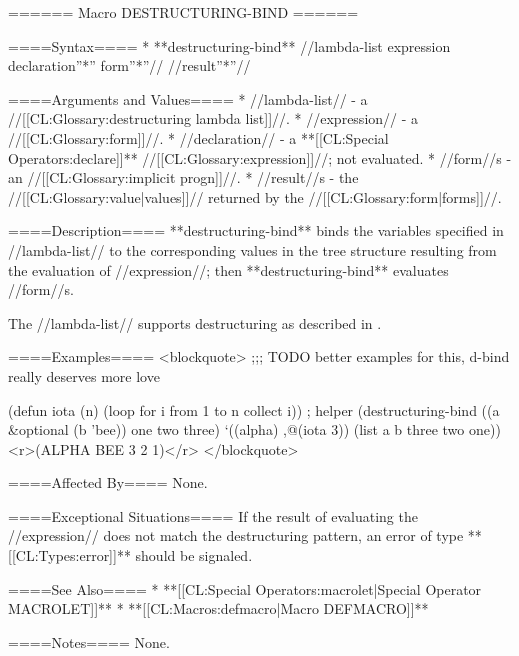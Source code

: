 ====== Macro DESTRUCTURING-BIND ======

====Syntax====
  *  **destructuring-bind** //lambda-list expression declaration''*'' form''*''// //result''*''//

====Arguments and Values====
  * //lambda-list// - a //[[CL:Glossary:destructuring lambda list]]//.
  * //expression// - a //[[CL:Glossary:form]]//.
  * //declaration// - a **[[CL:Special Operators:declare]]** //[[CL:Glossary:expression]]//; not evaluated.
  * //form//s - an //[[CL:Glossary:implicit progn]]//.
  * //result//s - the //[[CL:Glossary:value|values]]// returned by the //[[CL:Glossary:form|forms]]//.

====Description====
**destructuring-bind** binds the variables specified in //lambda-list// to the corresponding values in the tree structure resulting from the evaluation of //expression//; then **destructuring-bind** evaluates //form//s.

The //lambda-list// supports destructuring as described in \secref\DestructuringLambdaLists.

====Examples====
<blockquote>
;;; TODO better examples for this, d-bind really deserves more love

(defun iota (n) (loop for i from 1 to n collect i)) ; helper
(destructuring-bind ((a &optional (b 'bee)) one two three) 
    `((alpha) ,@(iota 3))
  (list a b three two one)) <r>(ALPHA BEE 3 2 1)</r>
</blockquote>

====Affected By====
None.

====Exceptional Situations====
If the result of evaluating the //expression// does not match the destructuring pattern, an error of type **[[CL:Types:error]]** should be signaled.

====See Also====
  * **[[CL:Special Operators:macrolet|Special Operator MACROLET]]**
  * **[[CL:Macros:defmacro|Macro DEFMACRO]]**

====Notes====
None.

 

